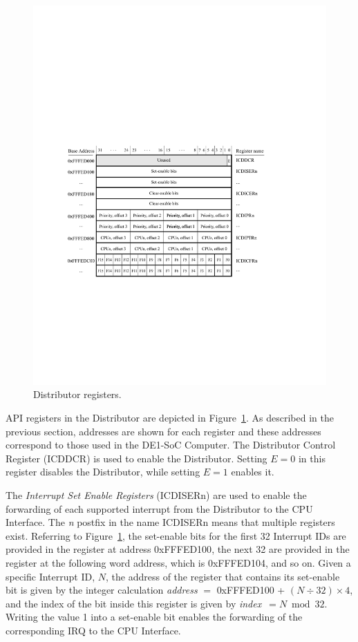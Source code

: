\documentclass[11pt, twoside, pdftex]{article}
\begin{document}
\begin{figure}[h!]
   \begin{center}
       \includegraphics{figures/distributor.pdf}
   \end{center}
   \caption{Distributor registers.}
	\label{fig:distributor}
\end{figure}

API registers in the Distributor are depicted in Figure~\ref{fig:distributor}. As
described in the previous section, addresses are shown for each register and these addresses 
correspond to those used in the DE1-SoC Computer. The Distributor Control Register
(ICDDCR) is used to enable the Distributor. Setting $E=0$ in this register disables the
Distributor, while setting $E=1$ enables it. 

The {\it Interrupt Set Enable Registers} (ICDISERn) are used to enable the forwarding of 
each supported interrupt from the Distributor to the CPU Interface. The {\it n} postfix in the
name ICDISERn means that multiple registers exist. Referring
to Figure~\ref{fig:distributor}, the set-enable bits for the first 32 Interrupt IDs are
provided in the register at address {\sf 0xFFFED100}, the next 32 are provided in the
register at the following word address, which is {\sf 0xFFFED104}, and so on. Given a
specific Interrupt ID, $N$, the address of the register that contains its set-enable bit is
given by the integer calculation {\it address} $=$ {\sf 0xFFFED100} + $(N \div 32) \times 4$, and 
the index of the bit inside this register is given by {\it index}~$= N \bmod 32$.
Writing the value 1 into a set-enable bit enables the forwarding of the corresponding IRQ 
to the CPU Interface.
\end{document}
